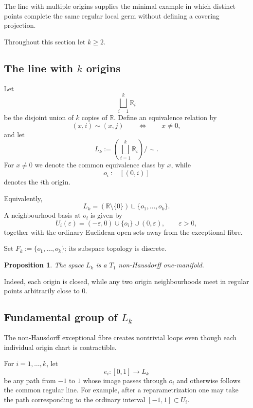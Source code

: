 \documentclass[11pt]{article}
\theoremstyle{plain}
\newtheorem{proposition}[theorem]{Proposition}
\theoremstyle{definition}
\begin{document}
The line with multiple origins supplies the minimal example in which distinct
points complete the same regular local germ without defining a covering projection.

Throughout this section let $k\geq 2$.

\subsection{The line with \texorpdfstring{$k$}{k} origins}
\label{subsec:Lk-definition}

Let
\[
\bigsqcup_{i=1}^k \mathbb R_i
\]
be the disjoint union of $k$ copies of $\mathbb R$.  Define an equivalence
relation by
\[
(x,i)\sim(x,j)
\qquad\Longleftrightarrow\qquad
x\neq 0,
\]
and let
\[
L_k
:=
\left(\bigsqcup_{i=1}^k\mathbb R_i\right)\big/\!\sim .
\]
For $x\neq0$ we denote the common equivalence class by $x$, while
\[
o_i:=[(0,i)]
\]
denotes the $i$th origin.

Equivalently,
\[
L_k
=
(\mathbb R\setminus\{0\})
\sqcup
\{o_1,\ldots,o_k\}.
\]
A neighbourhood basis at $o_i$ is given by
\[
U_i(\varepsilon)
=
(-\varepsilon,0)
\cup\{o_i\}
\cup(0,\varepsilon),
\qquad
\varepsilon>0,
\]
together with the ordinary Euclidean open sets away from the exceptional
fibre.

Set $F_k:=\{o_1,\ldots,o_k\}$; its subspace topology is discrete.

\begin{proposition}
\label{prop:Lk-basic-topology}
The space $L_k$ is a $T_1$ non-Hausdorff one-manifold.
\end{proposition}

Indeed, each origin is closed, while any two origin neighbourhoods meet in regular points arbitrarily close to $0$.

\subsection{Fundamental group of \texorpdfstring{$L_k$}{Lk}}
\label{subsec:Lk-cycles}

The non-Hausdorff exceptional fibre creates nontrivial loops even though
each individual origin chart is contractible.

For $i=1,\ldots,k$, let
\[
e_i:[0,1]\longrightarrow L_k
\]
be any path from $-1$ to $1$ whose image passes through $o_i$ and otherwise
follows the common regular line.  For example, after a reparametrization
one may take the path corresponding to the ordinary interval
$[-1,1]\subset U_i$.
\end{document}

